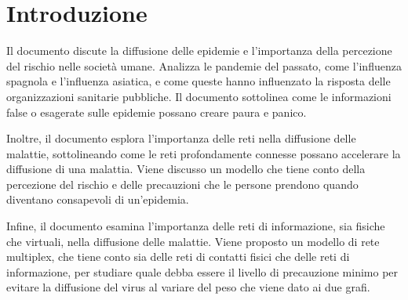 \section{Introduzione}\label{sec:introduzione}
    Il documento discute la diffusione delle epidemie e l'importanza della percezione del rischio nelle società umane.
    Analizza le pandemie del passato, come l'influenza spagnola e l'influenza asiatica, e come queste hanno influenzato
    la risposta delle organizzazioni sanitarie pubbliche.
    Il documento sottolinea come le informazioni false o esagerate sulle epidemie possano creare paura e panico.

    Inoltre, il documento esplora l'importanza delle reti nella diffusione delle malattie, sottolineando come le reti
    profondamente connesse possano accelerare la diffusione di una malattia.
    Viene discusso un modello che tiene conto della percezione del rischio e delle precauzioni che le persone prendono
    quando diventano consapevoli di un'epidemia.

    Infine, il documento esamina l'importanza delle reti di informazione, sia fisiche che virtuali, nella diffusione
    delle malattie.
    Viene proposto un modello di rete multiplex, che tiene conto sia delle reti di contatti fisici che delle reti di
    informazione, per studiare quale debba essere il livello di precauzione minimo per evitare la diffusione del virus
    al variare del peso che viene dato ai due grafi.